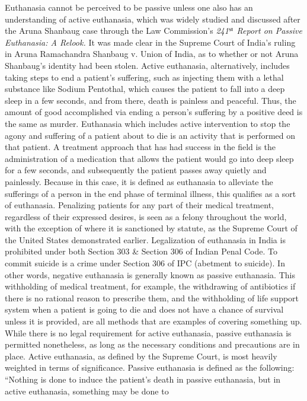 \begin{multicols}{2}
\noi
Euthanasia cannot be perceived to be passive unless one also has an understanding of active
euthanasia, which was widely studied and discussed after the Aruna Shanbaug case through
the Law Commission's \textit{241$^{\rm st}$ Report on Passive Euthanasia: A Relook.} It was made clear in
the Supreme Court of India's ruling in Aruna Ramachandra Shanbaug v. Union of India, as to
whether or not Aruna Shanbaug's identity had been stolen. Active euthanasia, alternatively,
includes taking steps to end a patient's suffering, such as injecting them with a lethal
substance like Sodium Pentothal, which causes the patient to fall into a deep sleep in a few
seconds, and from there, death is painless and peaceful. Thus, the amount of good
accomplished via ending a person's suffering by a positive deed is the same as murder.
Euthanasia which includes active intervention to stop the agony and suffering of a patient
about to die is an activity that is performed on that patient. A treatment approach that has had
success in the field is the administration of a medication that allows the patient would go into
deep sleep for a few seconds, and subsequently the patient passes away quietly and
painlessly. Because in this case, it is defined as euthanasia to alleviate the sufferings of a
person in the end phase of terminal illness, this qualifies as a sort of euthanasia. Penalizing
patients for any part of their medical treatment, regardless of their expressed desires, is seen
as a felony throughout the world, with the exception of where it is sanctioned by statute, as
the Supreme Court of the United States demonstrated earlier. Legalization of euthanasia in
India is prohibited under both Section 303 \& Section 306 of Indian Penal Code. To commit
suicide is a crime under Section 306 of IPC (abetment to suicide). In other words, negative  
euthanasia is generally known as passive euthanasia. This withholding of medical treatment,
for example, the withdrawing of antibiotics if there is no rational reason to prescribe them,
and the withholding of life support system when a patient is going to die and does not have a
chance of survival unless it is provided, are all methods that are examples of covering
something up. While there is no legal requirement for active euthanasia, passive euthanasia is
permitted nonetheless, as long as the necessary conditions and precautions are in place.
Active euthanasia, as defined by the Supreme Court, is most heavily weighted in terms of
significance. Passive euthanasia is defined as the following: “Nothing is done to induce the
patient's death in passive euthanasia, but in active euthanasia, something may be done to

\end{multicols}
